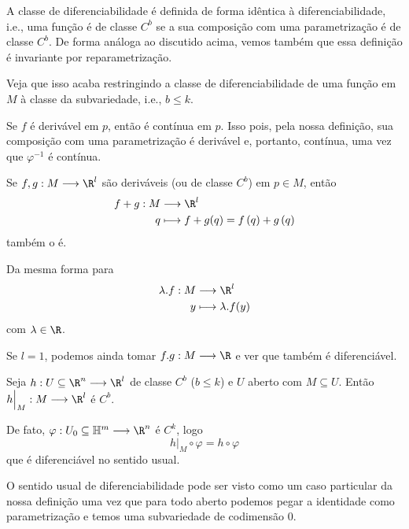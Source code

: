 \begin{note}
    A classe de diferenciabilidade é definida de forma idêntica à diferenciabilidade, i.e., uma função é de classe $C^{b}$ se a sua composição com uma parametrização é de classe $C^{b}$. De forma análoga ao discutido acima, vemos também que essa definição é invariante por reparametrização.

    Veja que isso acaba restringindo a classe de diferenciabilidade de uma função em $M$ à classe da subvariedade, i.e., $b\le k$.
\end{note}

\begin{remark}
    Se $f$ é derivável em $p$, então é contínua em $p$. Isso pois, pela nossa definição, sua composição com uma parametrização é derivável e, portanto, contínua, uma vez que $\varphi ^{-1}$ é contínua.
\end{remark}

\begin{remark}
    Se $f, g: M \longrightarrow \R^{l}$ são deriváveis (ou de classe $C^{b}$) em $p \in M$, então
    \begin{align*}
        f+g: M &\longrightarrow \R^{l} \\
        q &\longmapsto f+g(q) = f\left( q \right) + g\left( q \right) 
    \end{align*}
    também o é.

    Da mesma forma para
    \begin{align*}
        \lambda . f: M &\longrightarrow \R^{l} \\
        y &\longmapsto \lambda . f(y)
    \end{align*}
    com $\lambda\in \R$.

    Se $l=1$, podemos ainda tomar $f . g: M \longrightarrow \R$ e ver que também é diferenciável.
\end{remark}

\begin{remark}
    Seja $h: U\subseteq\R^{n} \longrightarrow \R^{l}$ de classe $C^{b}$ ($b\le k$) e $U$ aberto com $M\subseteq U$. Então $h\Big|_{M} : M \longrightarrow \R^{l}$ é $C^{b}$.

    De fato, $\varphi : U_0\subseteq\mathbb{H}^{m} \longrightarrow \R^{n}$ é $C^{k}$, logo \[
    h\Big|_{M} \circ  \varphi = h \circ \varphi 
    \] que é diferenciável no sentido usual.
\end{remark}

\begin{note}
    O sentido usual de diferenciabilidade pode ser visto como um caso particular da nossa definição uma vez que para todo aberto podemos pegar a identidade como parametrização e temos uma subvariedade de codimensão 0.
\end{note}

